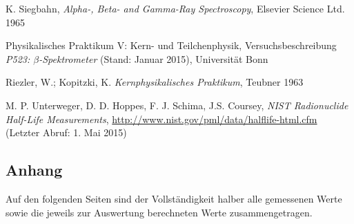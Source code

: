 \documentclass[11pt, a4paper]{article}
\numberwithin{equation}{section}
\begin{document}
\FloatBarrier
\vspace{\fill}
\begin{thebibliography}{19}
	K. Siegbahn,
	\emph{Alpha-, Beta- and Gamma-Ray Spectroscopy},
	Elsevier Science Ltd. 1965

	Physikalisches Praktikum V: Kern- und Teilchenphysik,
	Versuchsbeschreibung \emph{P523: $\beta$-Spektrometer} (Stand: Januar 2015),
	Universität Bonn	

	Riezler, W.; Kopitzki, K.
	\emph{Kernphysikalisches Praktikum},
	Teubner 1963

	M. P. Unterweger, D. D. Hoppes, F. J. Schima, J.S. Coursey,
	\emph{NIST Radionuclide Half-Life Measurements},
	\url{http://www.nist.gov/pml/data/halflife-html.cfm} (Letzter Abruf: 1. Mai 2015)

\end{thebibliography}

\begin{appendix}
\section{Anhang}
Auf den folgenden Seiten sind der Vollständigkeit halber alle gemessenen Werte sowie die jeweils zur Auswertung berechneten Werte zusammengetragen.
\clearpage

\end{appendix}
\end{document}
